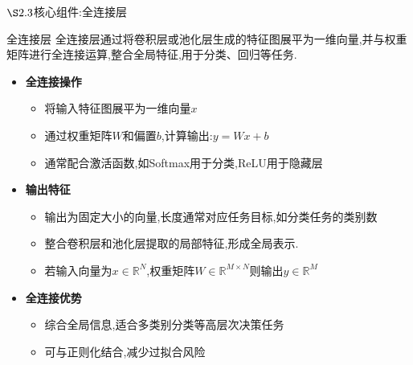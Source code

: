 \documentclass{beamer}
\begin{document}
\begin{frame}{$\S2.3$核心组件:全连接层}
    \begin{block}{全连接层}
        全连接层通过将卷积层或池化层生成的特征图展平为一维向量,并与权重矩阵进行全连接运算,整合全局特征,用于分类、回归等任务.
    \end{block}
    \begin{itemize}
        \item \textbf{全连接操作}
        \begin{itemize}
            \item 将输入特征图展平为一维向量$x$
            \item 通过权重矩阵$W$和偏置$b$,计算输出:$y=Wx+b$
            \item 通常配合激活函数,如Softmax用于分类,ReLU用于隐藏层
        \end{itemize}
        \item \textbf{输出特征}
        \begin{itemize}
            \item 输出为固定大小的向量,长度通常对应任务目标,如分类任务的类别数
            \item 整合卷积层和池化层提取的局部特征,形成全局表示.
            \item 若输入向量为$x\in\mathbb{R}^N$,权重矩阵$W\in\mathbb{R}^{M \times N}$则输出$y\in\mathbb{R}^M$
        \end{itemize}
        \item \textbf{全连接优势}
        \begin{itemize}
            \item 综合全局信息,适合多类别分类等高层次决策任务
            \item 可与正则化结合,减少过拟合风险
        \end{itemize}
    \end{itemize}
\end{frame}
\end{document}
